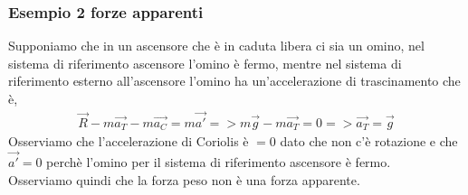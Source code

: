         \subsubsection{Esempio 2 forze apparenti}
            Supponiamo che in un ascensore che è in caduta libera ci sia un omino, nel sistema di riferimento ascensore l'omino è fermo, mentre nel sistema di riferimento esterno all'ascensore l'omino ha un'accelerazione di trascinamento che è,
            \begin{align*}
                \vec{R}-m\vec{a_T}-m\vec{a_C}=m\vec{a'} => m\vec{g}-m\vec{a_T}=0 => \vec{a_T}=\vec{g}
            \end{align*}
            Osserviamo che l'accelerazione di Coriolis è $=0$ dato che non c'è rotazione e che $\vec{a'}=0$ perchè l'omino per il sistema di riferimento ascensore è fermo.\\
            Osserviamo quindi che la forza peso non è una forza apparente.

